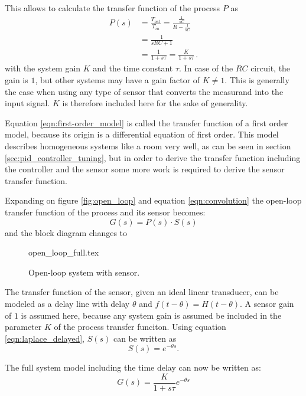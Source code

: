 This allows to calculate the transfer function of the process $P$ as
\begin{align}
    P(s) &= \frac{T_{out}}{T_{in}} = \frac{\frac{1}{sC}}{R-\frac{1}{sC}} \nonumber\\
    &= \frac{1}{sRC + 1} \nonumber\\
    &= \frac{1}{1 + s\tau} = \frac{K}{1 + s\tau}\,. \label{eqn:first-order_model}
\end{align}
with the system gain $K$ and the time constant $\tau$. In case of the $RC$ circuit, the gain is $1$, but other systems may have a gain factor of $K \neq 1$. This is generally the case when using any type of sensor that converts the measurand into the input signal. $K$ is therefore included here for the sake of generality.

Equation \ref{eqn:first-order_model} is called the transfer function of a first order model, because its origin is a differential equation of first order. This model describes homogeneous systems like a room very well, as can be seen in section \ref{sec:pid_controller_tuning}, but in order to derive the transfer function including the controller and the sensor some more work is required to derive the sensor transfer function.

Expanding on figure \ref{fig:open_loop} and equation \ref{eqn:convolution} the open-loop transfer function of the process and its sensor becomes:
\begin{equation}
    G(s) = P(s) \cdot S(s)
\end{equation}
and the block diagram changes to
\begin{figure}[htb]
    \centering
        {open_loop_full.tex}
    \caption{Open-loop system with sensor.}
\end{figure}

The transfer function of the sensor, given an ideal linear transducer, can be modeled as a delay line with delay $\theta$ and $f(t-\theta) = H(t-\theta)$. A sensor gain of $1$ is assumed here, because any system gain is assumed be included in the parameter $K$ of the process transfer funciton. Using equation \ref{eqn:laplace_delayed}, $S(s)$ can be written as
\begin{equation}
    S(s) = e^{-\theta s} .
\end{equation}

The full system model including the time delay can now be written as:
\begin{equation}
    G(s) = \frac{K}{1 + s\tau} e^{-\theta s} \label{eqn:first-order_plus_dead_time_model}
\end{equation}


